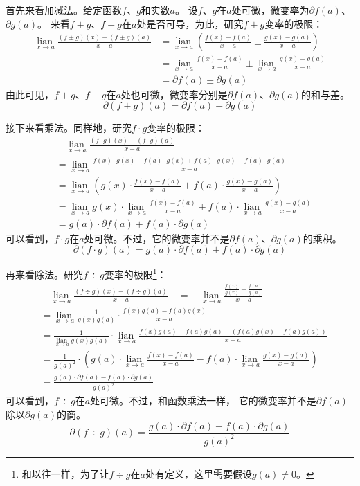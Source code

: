 \documentclass[12pt,UTF8]{ctexbook}
\newcommand{\lian}[1]{
    \underset{#1}{\operatorname{lian}\,}
}
\begin{document}
首先来看加减法。给定函数$f$、$g$和实数$a$。
设$f$、$g$在$a$处可微，微变率为$\partial f(a)$、$\partial g(a)$。
来看$f+g$、$f-g$在$a$处是否可导，为此，研究$f \pm g$变率的极限：
\begin{align*}
    \lian{x\to a} \frac{(f \pm g)(x) - (f \pm g)(a)}{x - a} &= \lian{x\to a} \left(\frac{f(x) - f(a)}{x - a} \pm \frac{g(x) - g(a)}{x - a}\right)  \\
    &= \lian{x\to a} \frac{f(x) - f(a)}{x - a} \pm \lian{x\to a} \frac{g(x) - g(a)}{x - a}  \\
    &= \partial f(a) \pm \partial g(a) 
\end{align*}
由此可见，$f+g$、$f-g$在$a$处也可微，微变率分别是$\partial f(a)$、$\partial g(a)$的和与差。
$$ \partial (f \pm g)(a) = \partial f(a) \pm \partial g(a) $$

接下来看乘法。同样地，研究$f \cdot g$变率的极限：
\begin{align*}
    & \quad \lian{x\to a} \frac{(f \cdot g)(x) - (f \cdot g)(a)}{x - a}  \\
    &=  \lian{x\to a} \frac{f(x)\cdot g(x) - f(a)\cdot g(x) + f(a)\cdot g(x) - f(a)\cdot g(a)}{x - a}  \\
    &= \lian{x\to a} \left(g(x)\cdot\frac{f(x) - f(a)}{x - a} + f(a)\cdot\frac{g(x) - g(a)}{x - a}\right)  \\
    &= \lian{x\to a} g(x) \cdot \lian{x\to a}\frac{f(x) - f(a)}{x - a} + f(a)\cdot \lian{x\to a} \frac{g(x) - g(a)}{x - a}  \\
    &= g(a)\cdot\partial f(a) + f(a) \cdot\partial g(a) 
\end{align*}
可以看到，$f \cdot g$在$a$处可微。不过，它的微变率并不是$\partial f(a)$、$\partial g(a)$的乘积。
$$ \partial (f \cdot g)(a) = g(a)\cdot\partial f(a) + f(a) \cdot\partial g(a) $$

再来看除法。研究$f \div g$变率的极限\footnote{和以往一样，为了让$f \div g$在$a$处有定义，这里需要假设$g(a)\neq 0$。}：
\begin{align*}
    & \quad \lian{x\to a} \frac{(f \div g)(x) - (f \div g)(a)}{x - a} \quad = \quad \lian{x\to a} \frac{\frac{f(x)}{g(x)} - \frac{f(a)}{g(a)}}{x - a}  \\
    &= \lian{x\to a} \frac{1}{g(x)g(a)}\cdot\frac{f(x) g(a) - f(a) g(x)}{x - a}  \\
    &= \frac{1}{\lian{x\to a}g(x)g(a)} \cdot \lian{x\to a} \frac{f(x) g(a) - f(a) g(a) - (f(a) g(x) - f(a) g(a))}{x - a}  \\
    &= \frac{1}{g(a)^2}\cdot \left( g(a)\cdot \lian{x\to a} \frac{f(x) - f(a)}{x - a} - f(a) \cdot\lian{x\to a} \frac{g(x) - g(a)}{x - a}\right)  \\
    &= \frac{g(a)\cdot \partial f(a) - f(a)\cdot \partial g(a)}{g(a)^2} 
\end{align*}
可以看到，$f \div g$在$a$处可微。不过，和函数乘法一样，
它的微变率并不是$\partial f(a)$除以$\partial g(a)$的商。
$$ \partial (f \div g)(a) = \frac{g(a)\cdot \partial f(a) - f(a)\cdot \partial g(a)}{g(a)^2} $$
\end{document}
